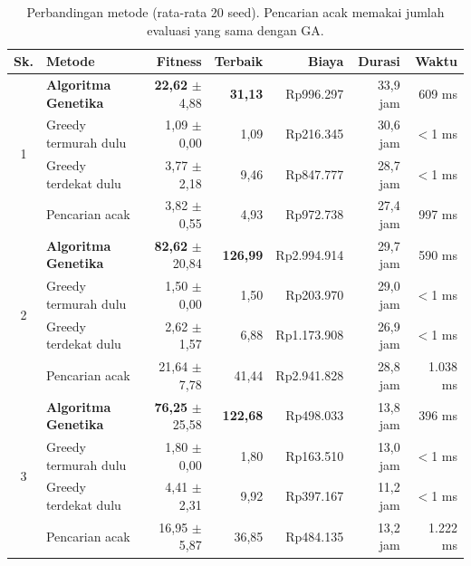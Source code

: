 \begin{table}[H]
\centering
\caption{Perbandingan metode (rata-rata 20 seed). Pencarian acak memakai jumlah evaluasi yang sama dengan GA.}
\label{tab:banding}
\small
\setlength{\tabcolsep}{4.5pt}
\begin{tabular}{@{}c l r r r r r@{}}
\toprule
\textbf{Sk.} & \textbf{Metode} & \textbf{Fitness} & \textbf{Terbaik} & \textbf{Biaya} & \textbf{Durasi} & \textbf{Waktu} \\
\midrule
\multirow{4}{*}{1} & \textbf{Algoritma Genetika} & \textbf{22,62} $\pm$ 4,88 & \textbf{31,13} & Rp996.297 & 33,9 jam & 609 ms \\
 & Greedy termurah dulu & 1,09 $\pm$ 0,00 & 1,09 & Rp216.345 & 30,6 jam & $<$1 ms \\
 & Greedy terdekat dulu & 3,77 $\pm$ 2,18 & 9,46 & Rp847.777 & 28,7 jam & $<$1 ms \\
 & Pencarian acak & 3,82 $\pm$ 0,55 & 4,93 & Rp972.738 & 27,4 jam & 997 ms \\
\midrule
\multirow{4}{*}{2} & \textbf{Algoritma Genetika} & \textbf{82,62} $\pm$ 20,84 & \textbf{126,99} & Rp2.994.914 & 29,7 jam & 590 ms \\
 & Greedy termurah dulu & 1,50 $\pm$ 0,00 & 1,50 & Rp203.970 & 29,0 jam & $<$1 ms \\
 & Greedy terdekat dulu & 2,62 $\pm$ 1,57 & 6,88 & Rp1.173.908 & 26,9 jam & $<$1 ms \\
 & Pencarian acak & 21,64 $\pm$ 7,78 & 41,44 & Rp2.941.828 & 28,8 jam & 1.038 ms \\
\midrule
\multirow{4}{*}{3} & \textbf{Algoritma Genetika} & \textbf{76,25} $\pm$ 25,58 & \textbf{122,68} & Rp498.033 & 13,8 jam & 396 ms \\
 & Greedy termurah dulu & 1,80 $\pm$ 0,00 & 1,80 & Rp163.510 & 13,0 jam & $<$1 ms \\
 & Greedy terdekat dulu & 4,41 $\pm$ 2,31 & 9,92 & Rp397.167 & 11,2 jam & $<$1 ms \\
 & Pencarian acak & 16,95 $\pm$ 5,87 & 36,85 & Rp484.135 & 13,2 jam & 1.222 ms \\
\bottomrule
\end{tabular}
\end{table}

